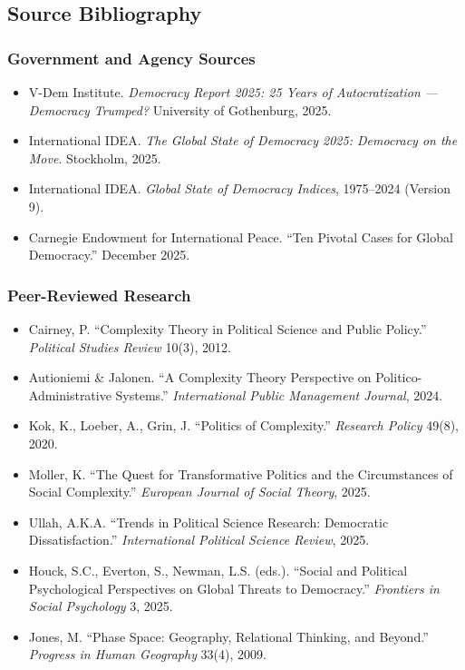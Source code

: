 \documentclass[11pt,letterpaper]{article}
\begin{document}
\subsection{Source Bibliography}

\subsubsection{Government and Agency Sources}
\begin{itemize}[noitemsep]
  \item V-Dem Institute. \textit{Democracy Report 2025: 25 Years of Autocratization --- Democracy Trumped?} University of Gothenburg, 2025.
  \item International IDEA. \textit{The Global State of Democracy 2025: Democracy on the Move}. Stockholm, 2025.
  \item International IDEA. \textit{Global State of Democracy Indices}, 1975--2024 (Version 9).
  \item Carnegie Endowment for International Peace. ``Ten Pivotal Cases for Global Democracy.'' December 2025.
\end{itemize}

\subsubsection{Peer-Reviewed Research}
\begin{itemize}[noitemsep]
  \item Cairney, P. ``Complexity Theory in Political Science and Public Policy.'' \textit{Political Studies Review} 10(3), 2012.
  \item Autioniemi \& Jalonen. ``A Complexity Theory Perspective on Politico-Administrative Systems.'' \textit{International Public Management Journal}, 2024.
  \item Kok, K., Loeber, A., Grin, J. ``Politics of Complexity.'' \textit{Research Policy} 49(8), 2020.
  \item Moller, K. ``The Quest for Transformative Politics and the Circumstances of Social Complexity.'' \textit{European Journal of Social Theory}, 2025.
  \item Ullah, A.K.A. ``Trends in Political Science Research: Democratic Dissatisfaction.'' \textit{International Political Science Review}, 2025.
  \item Houck, S.C., Everton, S., Newman, L.S. (eds.). ``Social and Political Psychological Perspectives on Global Threats to Democracy.'' \textit{Frontiers in Social Psychology} 3, 2025.
  \item Jones, M. ``Phase Space: Geography, Relational Thinking, and Beyond.'' \textit{Progress in Human Geography} 33(4), 2009.
\end{itemize}
\end{document}
